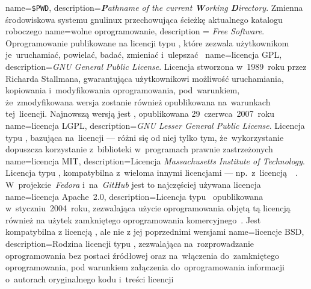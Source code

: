 {
	name={\texttt{\$PWD}},
	description={\emph{\textbf{P}athname of the current \textbf{W}orking \textbf{D}irectory}. Zmienna środowiskowa systemu \gls{gnulinux} przechowująca ścieżkę aktualnego katalogu roboczego}
}
{
	name={wolne oprogramowanie},
	description = {\emph{Free Software}. Oprogramowanie publikowane na licencji typu , które zezwala użytkownikom je~uruchamiać, powielać, badać, zmieniać i~ulepszać~\cite{free-software}}
}
{
	name={licencja GPL},
	description={\emph{GNU General Public License}. Licencja  stworzona w~1989~roku przez Richarda Stallmana, gwarantująca użytkownikowi możliwość uruchamiania, kopiowania i~modyfikowania oprogramowania, pod~warunkiem, że~zmodyfikowana wersja zostanie również opublikowana na~warunkach tej~licencji. Najnowszą wersją  jest , opublikowana 29~czerwca~2007~roku~\cite{gpl3,wiki:licenses-comparison}}
}
{
	name={licencja LGPL},
	description={\emph{GNU Lesser General Public License}. Licencja typu , bazująca na~licencji  --- różni się od niej tylko tym, że~wykorzystanie  dopuszcza korzystanie z~biblioteki w~programach prawnie zastrzeżonych~\cite{lgpl3,why-not-lgpl,wiki:licenses-comparison}}
}
{
	name={licencja MIT},
	description={Licencja \emph{Massachusetts Institute of Technology}. Licencja typu , kompatybilna z~wieloma innymi  licencjami --- np.~z~licencją~~\cite{mit}. W~projekcie~\emph{Fedora} i~na~\emph{GitHub} jest to najczęściej używana licencja~\cite{mit-popularity-fedora,mit-popularity-github,wiki:licenses-comparison}}
}
{
	name={licencja Apache~2.0},
	description={Licencja typu ~opublikowana w~styczniu~2004~roku, zezwalająca użycie oprogramowania objętą tą licencją również na użytek zamkniętego oprogramowania komercyjnego~\cite{apache2.0,wiki:licenses-comparison}. Jest kompatybilna z licencją , ale nie z jej poprzednimi wersjami}
}
{
	name={licencje BSD},
	description={Rodzina licencji typu , zezwalająca na~rozprowadzanie oprogramowania bez postaci źródłowej oraz na~włączenia do~zamkniętego oprogramowania, pod warunkiem załączenia do~oprogramowania informacji o~autorach oryginalnego kodu i~treści licencji~\cite{bsd,wiki:licenses-comparison}}
}
